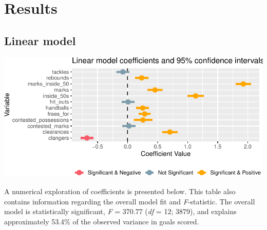 \documentclass{article}
\begin{document}
\hypertarget{results}{%
\section{Results}\label{results}}

\hypertarget{linear-model}{%
\subsection{Linear model}\label{linear-model}}

\includegraphics{OLET5608_TrentHenderson_files/figure-latex/unnamed-chunk-12-1.pdf}

A numerical exploration of coefficients is presented below. This table
also contains information regarding the overall model fit and
\emph{F}-statistic. The overall model is statistically significant,
\emph{F} = 370.77 (\emph{df} = 12; 3879), and explains approximately
53.4\% of the observed variance in goals scored.
\end{document}
